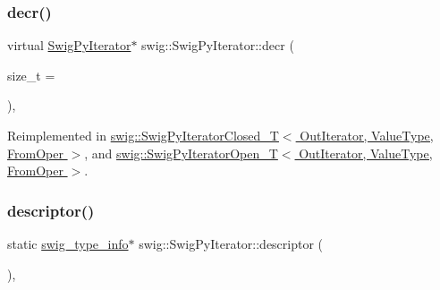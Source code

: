 \mbox{\label{structswig_1_1_swig_py_iterator_aad0c74a8c95526184fefb897476320ef}} 
\subsubsection{\texorpdfstring{decr()}{decr()}}
{\footnotesize\ttfamily virtual \hyperlink{structswig_1_1_swig_py_iterator}{Swig\+Py\+Iterator}$\ast$ swig\+::\+Swig\+Py\+Iterator\+::decr (\begin{DoxyParamCaption}\item[{size\+\_\+t}]{ = {} }\end{DoxyParamCaption})\hspace{0.3cm}{\ttfamily [inline]}, {\ttfamily [virtual]}}



Reimplemented in \hyperlink{classswig_1_1_swig_py_iterator_closed___t_aafae78acb63a1c4acaf2a76d4e9f6267}{swig\+::\+Swig\+Py\+Iterator\+Closed\+\_\+\+T$<$ Out\+Iterator, Value\+Type, From\+Oper $>$}, and \hyperlink{classswig_1_1_swig_py_iterator_open___t_a5e556e6e84a3684129c79d38c171e976}{swig\+::\+Swig\+Py\+Iterator\+Open\+\_\+\+T$<$ Out\+Iterator, Value\+Type, From\+Oper $>$}.

\mbox{\label{structswig_1_1_swig_py_iterator_ac77f47f6ed06f7113252940588a3f39e}} 
\subsubsection{\texorpdfstring{descriptor()}{descriptor()}}
{\footnotesize\ttfamily static \hyperlink{structswig__type__info}{swig\+\_\+type\+\_\+info}$\ast$ swig\+::\+Swig\+Py\+Iterator\+::descriptor (\begin{DoxyParamCaption}{ }\end{DoxyParamCaption})\hspace{0.3cm}{\ttfamily [inline]}, {\ttfamily [static]}}

\mbox{\label{structswig_1_1_swig_py_iterator_a76881aa4c938f5915badd57fc7da074c}} 

